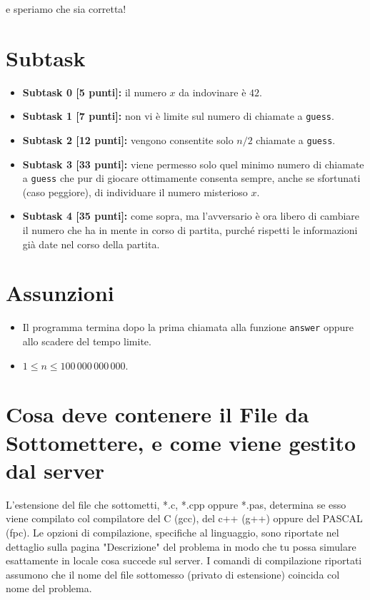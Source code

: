 \documentclass[a4paper,11pt]{article}
\begin{document}
  \noindent
  e speriamo che sia corretta!
  
  \section*{Subtask}
  \begin{itemize}
    \item \textbf{Subtask 0 [5 punti]:} il numero $x$ da indovinare è $42$.
    \item \textbf{Subtask 1 [7 punti]:} non vi è limite sul numero di chiamate a \texttt{guess}.
    \item \textbf{Subtask 2 [12 punti]:} vengono consentite solo $n/2$ chiamate a \texttt{guess}.
    \item \textbf{Subtask 3 [33 punti]:} viene permesso solo quel minimo numero di chiamate a \texttt{guess} che pur di giocare ottimamente consenta sempre, anche se sfortunati (caso peggiore), di individuare il numero misterioso $x$.
    \item \textbf{Subtask 4 [35 punti]:} come sopra, ma l'avversario è ora libero di cambiare il numero che ha in mente in corso di partita, purché rispetti le informazioni già date nel corso della partita.
  \end{itemize}
  
  \section*{Assunzioni}
  \begin{itemize}[nolistsep, noitemsep]
    \item Il programma termina dopo la prima chiamata alla funzione \texttt{answer} oppure allo scadere del tempo limite.
    \item $1 \le n \le 100\,000\,000\,000$.
  \end{itemize}

  \section*{Cosa deve contenere il File da Sottomettere, e come viene gestito dal server}

  L'estensione del file che sottometti, *.c, *.cpp oppure *.pas,
  determina se esso viene compilato col compilatore del C (gcc),
  del c++ (g++) oppure del PASCAL (fpc).
  Le opzioni di compilazione, specifiche al linguaggio,
  sono riportate nel dettaglio sulla pagina "Descrizione" del problema
  in modo che tu possa simulare esattamente in locale cosa succede sul server.
  I comandi di compilazione riportati assumono che il nome del file sottomesso (privato di estensione) coincida col nome del problema.
\end{document}
